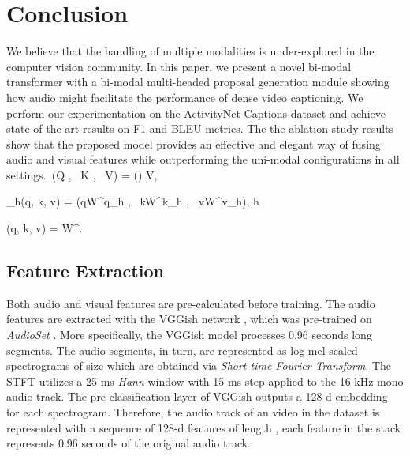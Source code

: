 \documentclass{src/bmvc2k}
\newcommand{\comma}{, \, }
\begin{document}
\section{Conclusion}

\vspace{-1ex}We believe that the handling of multiple modalities is under-explored in the computer vision community. In this paper, we present a novel bi-modal transformer with a bi-modal multi-headed proposal generation module showing how audio might facilitate the performance of dense video captioning. We perform our experimentation on the ActivityNet Captions dataset and achieve state-of-the-art results on F1 and BLEU metrics. The the ablation study results show that the proposed model provides an effective and elegant way of fusing audio and visual features while outperforming the uni-modal configurations in all settings.\
    (Q \comma K \comma V) = \bigg(\bigg) V,\label{eq:dot_product}

    _h(q, k, v) = (qW^q_h \comma kW^k_h \comma vW^v_h), \quad h \in [1, H] \label{eq:attention_head}

    (q, k, v) = \big[\text{head}_1(q, k, v) \comma \text{head}_2(q, k, v) \comma \dots \comma \text{head}_H(q, k, v)\big] W^.


\subsection{Feature Extraction \label{sec:feature_extraction}}

Both audio and visual features are pre-calculated before training. The audio features are extracted with the VGGish network \cite{Hershey2017}, which was pre-trained on \textit{AudioSet} \cite{Gemmeke2017}. More specifically, the VGGish model processes 0.96 seconds long segments. The audio segments, in turn, are represented as log mel-scaled spectrograms of size  which are obtained via \textit{Short-time Fourier Transform}. The STFT utilizes a 25 ms \textit{Hann} window with 15 ms step applied to the 16 kHz mono audio track. The pre-classification layer of VGGish outputs a 128-d embedding for each spectrogram. Therefore, the audio track of an  video in the dataset is represented with a sequence of 128-d features of length , each feature in the stack represents 0.96 seconds of the original audio track.
\end{document}
